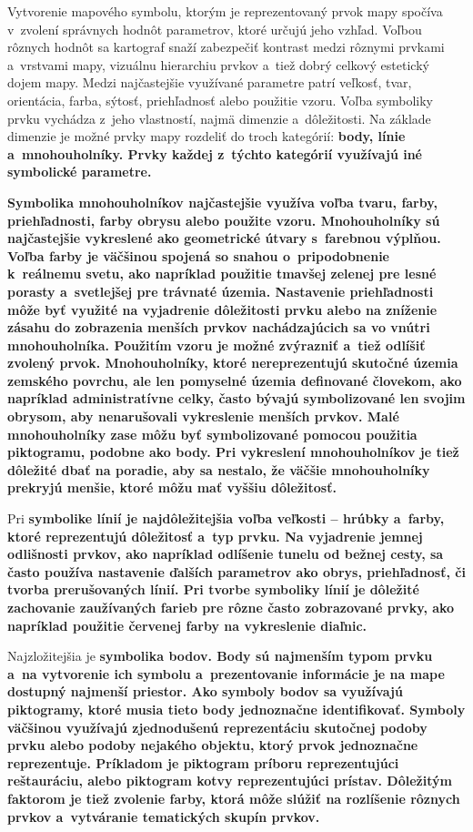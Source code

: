 Vytvorenie mapového symbolu, ktorým je reprezentovaný prvok mapy spočíva v~zvolení správnych hodnôt parametrov, ktoré určujú jeho vzhľad. Voľbou rôznych hodnôt sa kartograf snaží zabezpečiť kontrast medzi rôznymi prvkami a~vrstvami mapy, vizuálnu hierarchiu prvkov a~tiež dobrý celkový estetický dojem mapy. Medzi najčastejšie využívané parametre patrí veľkosť, tvar, orientácia, farba, sýtosť, priehľadnosť alebo použitie vzoru. Voľba symboliky prvku vychádza z~jeho vlastností, najmä dimenzie a~dôležitosti. Na základe dimenzie je možné prvky mapy rozdeliť do troch kategórií: \bf body\rm, \bf línie \rm a~\bf mnohouholníky\rm. Prvky každej z~týchto kategórií využívajú iné symbolické parametre. 

\bf Symbolika mnohouholníkov \rm najčastejšie využíva voľba tvaru, farby, priehľadnosti, farby obrysu alebo použite vzoru. Mnohouholníky sú najčastejšie vykreslené ako geometrické útvary s~farebnou výplňou. Voľba farby je väčšinou spojená so snahou o~pripodobnenie k~reálnemu svetu, ako napríklad použitie tmavšej zelenej pre lesné porasty a~svetlejšej pre trávnaté územia. Nastavenie priehľadnosti môže byť využité na vyjadrenie dôležitosti prvku alebo na zníženie zásahu do zobrazenia menších prvkov nachádzajúcich sa vo vnútri mnohouholníka. Použitím vzoru je možné zvýrazniť a~tiež odlíšiť zvolený prvok. Mnohouholníky, ktoré nereprezentujú skutočné územia zemského povrchu, ale len pomyselné územia definované človekom, ako napríklad administratívne celky, často bývajú symbolizované len svojim obrysom, aby nenarušovali vykreslenie menších prvkov. Malé mnohouholníky zase môžu byť symbolizované pomocou použitia piktogramu, podobne ako body. Pri vykreslení mnohouholníkov je tiež dôležité dbať na poradie, aby sa nestalo, že väčšie mnohouholníky prekryjú menšie, ktoré môžu mať vyššiu dôležitosť.

Pri \bf symbolike línií \rm je najdôležitejšia voľba veľkosti -- hrúbky a~farby, ktoré reprezentujú dôležitosť a~typ prvku. Na vyjadrenie jemnej odlišnosti prvkov, ako napríklad odlíšenie tunelu od bežnej cesty, sa často používa nastavenie ďalších parametrov ako obrys, priehľadnosť, či tvorba prerušovaných línií. Pri tvorbe symboliky línií je dôležité zachovanie zaužívaných farieb pre rôzne často zobrazované prvky, ako napríklad použitie červenej farby na vykreslenie diaľnic.

Najzložitejšia je \bf symbolika bodov\rm. Body sú najmenším typom prvku a~na vytvorenie ich symbolu a~prezentovanie informácie je na mape dostupný najmenší priestor. Ako symboly bodov sa využívajú piktogramy, ktoré musia tieto body jednoznačne identifikovať. Symboly väčšinou využívajú zjednodušenú reprezentáciu skutočnej podoby prvku alebo podoby nejakého objektu, ktorý prvok jednoznačne reprezentuje. Príkladom je piktogram príboru reprezentujúci reštauráciu, alebo piktogram kotvy reprezentujúci prístav. Dôležitým faktorom je tiež zvolenie farby, ktorá môže slúžiť na rozlíšenie rôznych prvkov a~vytváranie tematických skupín prvkov.

